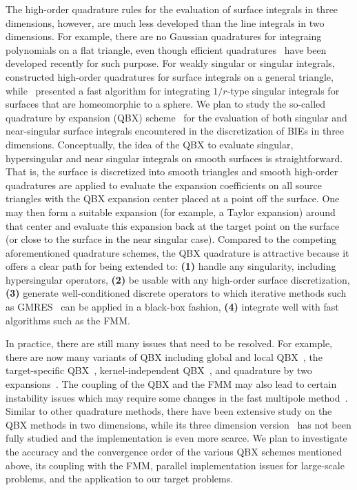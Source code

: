 The high-order quadrature rules for the evaluation of surface integrals
in three dimensions, however, are much less developed than the line
integrals in two dimensions. For example, there are no Gaussian
quadratures for integraing polynomials on a flat triangle, even though
efficient quadratures~\cite{xiao2010cma,vioreanu2014} have been
developed recently for such purpose. For weakly singular or singular
integrals,~\cite{bremer2012jcp,bremer2013jcp} constructed high-order
quadratures for surface integrals on a general triangle,
while~\cite{gimbutas2013sisc} presented a fast algorithm for integrating
$1/r$-type singular integrals for surfaces that are homeomorphic to a
sphere. We plan to study the so-called quadrature by expansion (QBX)
scheme~\cite{klockner2013jcp,qbx2} for the evaluation of both singular
and near-singular surface integrals encountered in the discretization of
BIEs in three dimensions. Conceptually, the idea of the QBX to evaluate
singular, hypersingular and near singular integrals on smooth surfaces
is straightforward. That is, the surface is discretized into smooth
triangles and smooth high-order quadratures are applied to evaluate the
expansion coefficients on all source triangles with the QBX expansion
center placed at a point off the surface. One may then form a suitable
expansion (for example, a Taylor expansion) around that center and
evaluate this expansion back at the target point on the surface (or
close to the surface in the near singular case). Compared to the
competing aforementioned quadrature schemes, the QBX quadrature is
attractive because it offers a clear path for being extended to:
\textbf{(1)} handle any singularity, including hypersingular operators,
\textbf{(2)} be usable with any high-order surface discretization,
\textbf{(3)} generate well-conditioned discrete operators to which
iterative methods such as GMRES~\cite{gmres} can be applied in a
black-box fashion, \textbf{(4)} integrate well with fast algorithms such
as the FMM. 

In practice, there are still many issues that need to be resolved. For
example, there are now many variants of QBX including global and local
QBX~\cite{klockner2013jcp,rachh2017jcp}, the target-specific
QBX~\cite{siegel2018jcp}, kernel-independent QBX~\cite{abtin2018bit},
and quadrature by two expansions~\cite{ding2019arxiv}. The coupling of
the QBX and the FMM may also lead to certain instability issues which
may require some changes in the fast multipole
method~\cite{wala2018jcp}. Similar to other quadrature methods, there
have been extensive study on the QBX methods in two dimensions, while
its three dimension
version~\cite{wala2019jcp,af2018sisc,siegel2018jcp,wala2019arxiv} has
not been fully studied and the implementation is even more scarce. We
plan to investigate the accuracy and the convergence order of the
various QBX schemes mentioned above, its coupling with the FMM, parallel
implementation issues for large-scale problems, and the application to
our target problems.

